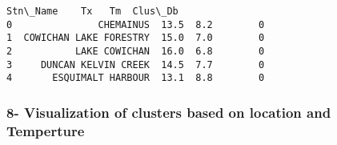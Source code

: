 \documentclass[11pt]{article}
\makeatletter
\newcommand{\boxspacing}{\kern\kvtcb@left@rule\kern\kvtcb@boxsep}
\newcommand{\prompt}[4]{
        {\ttfamily\llap{{\color{#2}[#3]:\hspace{3pt}#4}}\vspace{-\baselineskip}}
    }
\makeatother
\begin{document}
            \begin{tcolorbox}[breakable, size=fbox, boxrule=.5pt, pad at break*=1mm, opacityfill=0]
\prompt{Out}{outcolor}{20}{\boxspacing}
\begin{Verbatim}[commandchars=\\\{\}]
                 Stn\_Name    Tx   Tm  Clus\_Db
0               CHEMAINUS  13.5  8.2        0
1  COWICHAN LAKE FORESTRY  15.0  7.0        0
2           LAKE COWICHAN  16.0  6.8        0
3     DUNCAN KELVIN CREEK  14.5  7.7        0
4       ESQUIMALT HARBOUR  13.1  8.8        0
\end{Verbatim}
\end{tcolorbox}
        
    \hypertarget{visualization-of-clusters-based-on-location-and-temperture}{%
\subsubsection{8- Visualization of clusters based on location and
Temperture}\label{visualization-of-clusters-based-on-location-and-temperture}}
\end{document}
